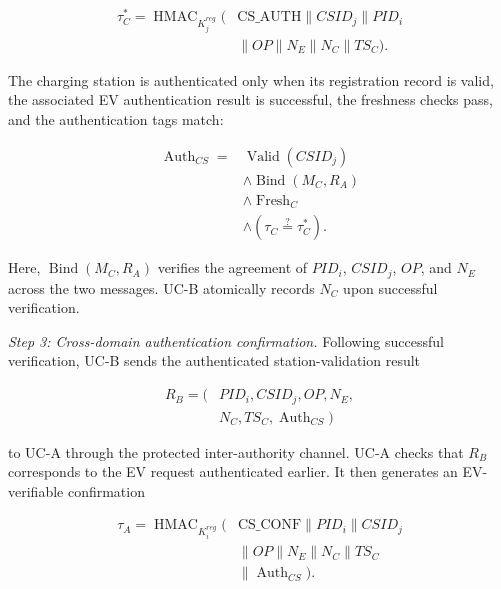 \documentclass[twocolumn,10pt,journal]{IEEEtran}
\begin{document}
\begin{equation}
\begin{aligned}
\tau_C^{*} =
\operatorname{HMAC}_{K_j^{reg}}\big(
&\mathrm{CS\_AUTH}\parallel CSID_j
\parallel PID_i\\
&\parallel OP\parallel N_E
\parallel N_C\parallel TS_C
\big).
\end{aligned}
\label{eq:cs_auth_expected}
\end{equation}

The charging station is authenticated only
when its registration record is valid,
the associated EV authentication result is
successful, the freshness checks pass,
and the authentication tags match:

\begin{equation}
\begin{aligned}
\operatorname{Auth}_{CS}
={}&\operatorname{Valid}(CSID_j)
\\
&\land\operatorname{Bind}(M_C,R_A)
\\
&\land\operatorname{Fresh}_{C}
\\
&\land(\tau_C\stackrel{?}{=}\tau_C^{*}).
\end{aligned}
\label{eq:cs_auth_decision}
\end{equation}

Here, $\operatorname{Bind}(M_C,R_A)$ verifies
the agreement of $PID_i$, $CSID_j$, $OP$,
and $N_E$ across the two messages. UC-B
atomically records $N_C$ upon successful
verification.

\textit{Step 3: Cross-domain authentication confirmation.}
Following successful verification, UC-B sends
the authenticated station-validation result

\begin{equation}
\begin{aligned}
R_B = (&PID_i,CSID_j,OP,N_E,\\
       &N_C,TS_C,\operatorname{Auth}_{CS})
\end{aligned}
\label{eq:cs_auth_result}
\end{equation}

to UC-A through the protected inter-authority
channel. UC-A checks that $R_B$ corresponds
to the EV request authenticated earlier.
It then generates an EV-verifiable confirmation

\begin{equation}
\begin{aligned}
\tau_A =
\operatorname{HMAC}_{K_i^{reg}}\big(
&\mathrm{CS\_CONF}\parallel PID_i
\parallel CSID_j\\
&\parallel OP\parallel N_E
\parallel N_C\parallel TS_C\\
&\parallel\operatorname{Auth}_{CS}
\big).
\end{aligned}
\label{eq:cs_auth_confirmation}
\end{equation}
\end{document}
